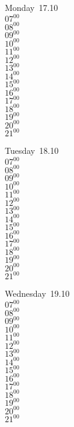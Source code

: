 \documentclass[11pt,a4paper]{book}\usepackage[]{graphicx}\usepackage[]{color}
\begin{document}
\begin{headerbox}
\end{headerbox}
\begin{weekdaybox}
  Monday~17.10\\
  { 
  \vfill
  $07^{00}$\\
$08^{00}$\\
$09^{00}$\\
$10^{00}$\\
$11^{00}$\\
$12^{00}$\\
$13^{00}$\\
$14^{00}$\\
$15^{00}$\\
$16^{00}$\\
$17^{00}$\\
$18^{00}$\\
$19^{00}$\\
$20^{00}$\\
$21^{00}$\\
  }
\end{weekdaybox}
\begin{weekdaybox}
  Tuesday~18.10\\
  { 
  \vfill
  $07^{00}$\\
$08^{00}$\\
$09^{00}$\\
$10^{00}$\\
$11^{00}$\\
$12^{00}$\\
$13^{00}$\\
$14^{00}$\\
$15^{00}$\\
$16^{00}$\\
$17^{00}$\\
$18^{00}$\\
$19^{00}$\\
$20^{00}$\\
$21^{00}$\\
  }
\end{weekdaybox}
\begin{weekdaybox}
  Wednesday~19.10\\
  { 
  \vfill
  $07^{00}$\\
$08^{00}$\\
$09^{00}$\\
$10^{00}$\\
$11^{00}$\\
$12^{00}$\\
$13^{00}$\\
$14^{00}$\\
$15^{00}$\\
$16^{00}$\\
$17^{00}$\\
$18^{00}$\\
$19^{00}$\\
$20^{00}$\\
$21^{00}$\\
  }
\end{weekdaybox}
\end{document}
